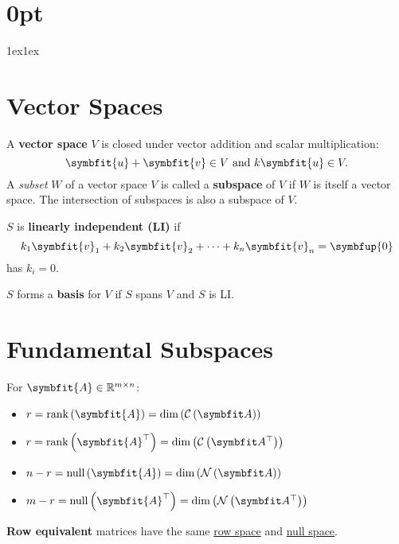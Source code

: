 \documentclass{article}
\begin{document}
\titlespacing*\section{0pt}{1ex}{1ex}
%
\setlength{\textfloatsep}{0pt}
%
\setlength{\abovedisplayskip}{1pt}
\setlength{\belowdisplayskip}{1pt}
%
\begin{minipage}[t]{62.39259259mm}
    \section*{Vector Spaces}
    A \textbf{vector space} \(V\) is closed under vector addition
    and scalar multiplication:
    \begin{equation*}
        \symbfit{u}+\symbfit{v} \in V \ \text{and} \ k\symbfit{u} \in V.
    \end{equation*}
    A \textit{subset} \(W\) of a vector space \(V\) is called a
    \textbf{subspace} of \(V\) if \(W\) is itself a vector space. The
    intersection of subspaces is also a subspace of \(V\).

    \(S\) is \textbf{linearly independent (LI)} if
    \begin{equation*}
        k_1 \symbfit{v}_1 + k_2 \symbfit{v}_2 + \cdots + k_n \symbfit{v}_n = \symbfup{0}
    \end{equation*}
    has \(k_i=0\).

    \(S\) forms a \textbf{basis} for \(V\) if \(S\) spans \(V\) and
    \(S\) is LI.
    \section*{Fundamental Subspaces}
    For \(\symbfit{A}\in\mathbb{R}^{m \times n}\):
    \begin{itemize}
        \item \(r = \rank{\left( \symbfit{A} \right)} = \dim{\left( \columnspace{A} \right)}\)
        \item \(r = \rank{\left( \symbfit{A}^\top \right)} = \dim{\left( \rowspace{A} \right)}\)
        \item \(n - r = \vnull{\left( \symbfit{A} \right)}      = \dim{\left( \nullspace{A} \right)}\)
        \item \(m - r = \vnull{\left( \symbfit{A}^\top \right)} = \dim{\left( \leftnullspace{A} \right)}\)
    \end{itemize}
    \textbf{Row equivalent} matrices have the same
    \underline{row space} and \underline{null space}.

\end{minipage}
\end{document}
